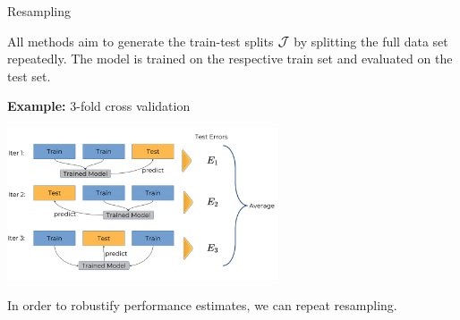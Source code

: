 \documentclass[11pt,compress,t,notes=noshow, xcolor=table]{beamer}
\begin{document}
\begin{vbframe}{Resampling}



All methods aim to generate the train-test splits $\mathcal{J}$ by splitting the full data set repeatedly.
The model is trained on the respective train set and evaluated on the test set.

\textbf{Example:} 3-fold cross validation

\begin{center}
\includegraphics[width=0.6\textwidth]{figure_man/crossvalidation.png}
\end{center}


In order to robustify performance estimates, we can repeat resampling.

\end{vbframe}





\endlecture
\end{document}
